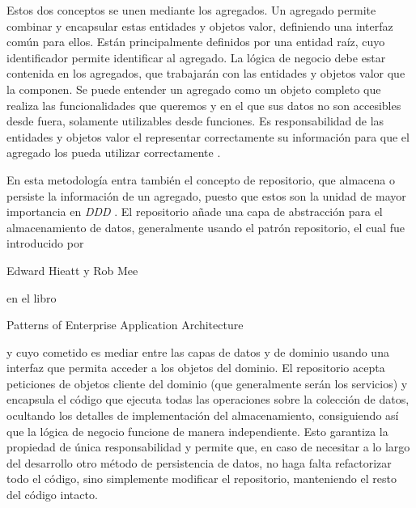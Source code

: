 Estos dos conceptos se unen mediante los agregados. Un agregado permite combinar
y encapsular estas entidades y objetos valor, definiendo una interfaz común para
ellos. Están principalmente definidos por una entidad raíz, cuyo identificador
permite identificar al agregado. La lógica de negocio debe estar contenida en
los agregados, que trabajarán con las entidades y objetos valor que la componen.
Se puede entender un agregado como un objeto completo que realiza las
funcionalidades que queremos y en el que sus datos no son accesibles desde
fuera, solamente utilizables desde funciones. Es responsabilidad de las
entidades y objetos valor el representar correctamente su información para que
el agregado los pueda utilizar correctamente \cite{ddd_golang}.

En esta metodología entra también el concepto de repositorio, que almacena o
persiste la información de un agregado, puesto que estos son la unidad de mayor
importancia en \textit{DDD} \cite{ddd_golang}. El repositorio añade una capa de
abstracción para el almacenamiento de datos, generalmente usando el patrón
repositorio, el cual fue introducido por \begin{otherlanguage}{english}Edward
Hieatt y Rob Mee\end{otherlanguage} en el libro
\begin{otherlanguage}{english} Patterns of Enterprise Application Architecture
\end{otherlanguage}\cite{fowler2002eea} y cuyo cometido es mediar entre las
capas de datos y de dominio usando una interfaz que permita acceder a los
objetos del dominio. El repositorio acepta peticiones de objetos cliente del
dominio (que generalmente serán los servicios) y encapsula el código que ejecuta
todas las operaciones sobre la colección de datos, ocultando los detalles de
implementación del almacenamiento, consiguiendo así que la lógica de negocio
funcione de manera independiente. Esto garantiza la propiedad de única
responsabilidad y permite que, en caso de necesitar a lo largo del desarrollo
otro método de persistencia de datos, no haga falta refactorizar todo el código,
sino simplemente modificar el repositorio, manteniendo el resto del código
intacto. 


